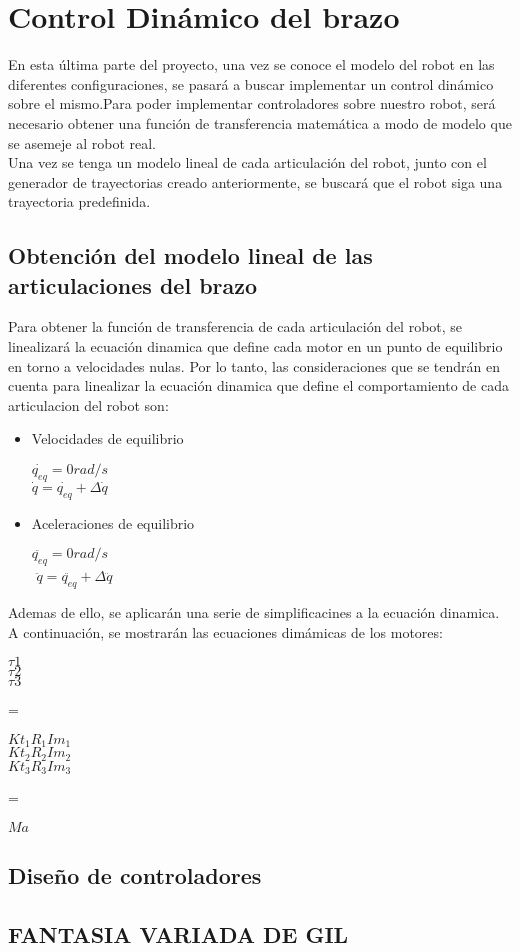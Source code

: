 \section{Control Dinámico del brazo}
En esta última parte del proyecto, una vez se conoce el modelo del robot en las diferentes configuraciones, se pasará a buscar implementar un control dinámico sobre el mismo.Para poder implementar controladores sobre nuestro robot, será necesario obtener una función de transferencia matemática a modo de modelo que se asemeje al robot real.\\
Una vez se tenga un modelo lineal de cada articulación del robot, junto con el generador de trayectorias creado anteriormente, se buscará que el robot siga una trayectoria predefinida.\\

	\subsection{Obtención del modelo lineal de las articulaciones del brazo}
Para obtener la función de transferencia de cada articulación del robot, se linealizará la ecuación dinamica que define cada motor en un punto de equilibrio en torno a velocidades nulas. Por lo tanto, las consideraciones que se tendrán en cuenta para linealizar la ecuación dinamica que define el comportamiento de cada articulacion del robot son:\\
\begin{itemize}
	\item Velocidades de equilibrio
	\begin{center}
		$ \dot{q_{eq}}=0 rad/s $\\
		$ \dot{q} =\dot{q_{eq}}+\Delta\dot{q}$
	\end{center}

	\item Aceleraciones de equilibrio
\begin{center}
	$ \ddot{q_{eq}}=0 rad/s $\\
	$  $
	$ \ddot{q} =\ddot{q_{eq}}+\Delta\ddot{q}$
\end{center}

\end{itemize}

Ademas de ello, se aplicarán una serie de simplificacines a la ecuación dinamica. A continuación, se mostrarán las ecuaciones dimámicas de los motores:\\
\begin{center}
	
	\begin{pmatriz}
	$ \tau1$ \\
	$ \tau2$ \\
	$ \tau3$ 
	\end{pmatriz}
	=
	\begin{pmatriz}
		$ Kt_{1}R_{1}Im_{1} $ \\
		$ Kt_{2}R_{2}Im_{2} $ \\
		$ Kt_{3}R_{3}Im_{3} $ 
	\end{pmatriz}
	=
	 \begin{pmatriz}
	 	$ Ma$
	 \end{pmatriz}
\end{center}
	\subsection{Diseño de controladores}
	\subsection{FANTASIA VARIADA DE GIL}